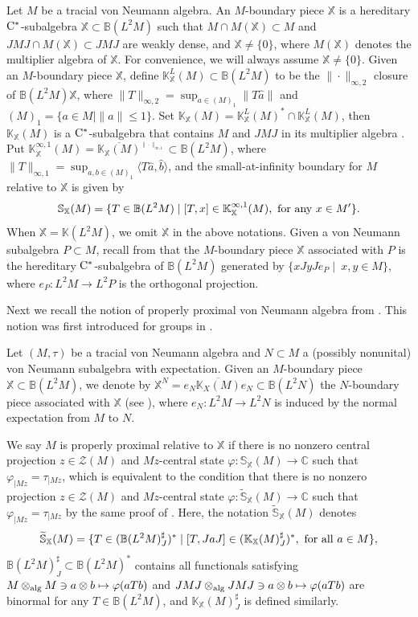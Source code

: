 \documentclass[a4paper,11pt]{amsart}
\theoremstyle{definition}
\newcommand{\B}{{\mathbb B}}
\newcommand{\C}{{\mathbb C}}
\newcommand{\K}{{\mathbb K}}
\newcommand{\bS}{{\mathbb S}}
\newcommand{\X}{{\mathbb X}}
\newcommand{\cZ}{{\mathcal Z}}
\newcommand{\ot}{\otimes}
\begin{document}
Let $M$ be a tracial von Neumann algebra.
An $M$-boundary piece $\X$ is a hereditary ${\rm C}^*$-subalgebra $\X\subset\B(L^2M)$
	such that $M\cap M(\X)\subset M$ and $JMJ\cap M(\X)\subset JMJ$ are weakly dense,
	and $\X\neq \{0\}$,
	where $M(\X)$ denotes the multiplier algebra of $\X$.
For convenience, we will always assume $\X\neq \{0\}$.
Given an $M$-boundary piece $\X$, define $\K_\X^L(M)\subset \B(L^2M)$ to be the $\|\cdot\|_{\infty,2}$ closure of $\B(L^2M)\X$,
	where $\|T\|_{\infty,2}=\sup_{a\in (M)_1}\|T\hat a\|$
		and $(M)_1=\{a\in M\mid \|a\|\leq 1\}$.
Set $\K_\X(M)=\K_\X^L(M)^*\cap \K_\X^L(M)$,
	then $\K_\X(M)$ is a ${\rm C}^*$-subalgebra that contains $M$ and $JMJ$ in its multiplier algebra \cite[Proposition 3.5]{DKEP22}. 
Put $\K^{\infty,1}_\X(M)=\overline{\K_\X(M)}^{_{\|\cdot\|_{\infty,1}}}\subset \B(L^2M)$, 
	where $\|T\|_{\infty,1}=\sup_{a,b\in (M)_1}\langle T\hat a, \hat b\rangle$,
	and the small-at-infinity boundary for $M$ relative to $\X$ is given by 
$$
\bS_\X(M)=\{T\in\B(L^2M)\mid [T,x]\in \K_\X^{\infty,1}(M),{\rm\ for\ any\ }x\in M'\}.
$$
When $\X=\K(L^2M)$, we omit $\X$ in the above notations.
Given a von Neumann subalgebra $P\subset M$, recall from \cite[Lemma 6.12]{DP23}
	that the $M$-boundary piece $\X$ associated with $P$ is the
	hereditary ${\rm C}^*$-subalgebra of $\B(L^2M)$ 
	generated by $\{x JyJ e_P\mid\  x,y\in M\}$,
	where $e_P: L^2M\to L^2P$ is the orthogonal projection.



Next we recall the notion of properly proximal von Neumann algebra from \cite{DKEP22}. This notion was first introduced for groups
	in \cite{BIP21}.

Let $(M,\tau)$ be a tracial von Neumann algebra and $N\subset M$ a (possibly nonunital) von Neumann subalgebra with expectation.
Given an $M$-boundary piece $\X\subset \B(L^2M)$, we denote by $\X^N=\overline{e_N \K_X(M) e_N}\subset \B(L^2N)$ the $N$-boundary piece
	associated with $\X$ (see \cite[Remark 6.3]{DKEP22}),
	where $e_N: L^2M\to L^2N$ is induced by the normal expectation from $M$ to $N$.
	
We say $M$ is properly proximal relative to $\X$
	if there is no nonzero central projection $z\in \cZ(M)$ and $Mz$-central state
	$\varphi: \bS_{\X}(M)\to \C$ such that $\varphi_{\mid Mz}=\tau_{\mid Mz}$,
	which is equivalent to the condition that
	there is no nonzero projection $z\in \cZ(M)$ and $Mz$-central state $\varphi: \widetilde \bS_\X(M)\to \C$
	such that $\varphi_{\mid Mz}=\tau_{\mid Mz}$
	by the same proof of \cite[Lemma 8.5]{DKEP22}.
Here, the notation $\widetilde \bS_\X(M)$ denotes
$$
\widetilde \bS_\X(M)=\{T\in (\B(L^2M)^\sharp_J)^*\mid [T,JaJ]\in (\K_\X(M)^\sharp_J)^*,{\rm\  for\ all\ }a\in M\},
$$
	$\B(L^2M)^\sharp_J\subset \B(L^2M)^*$ contains all functionals satisfying
	$M\ot_{\rm alg} M\ni a\ot b\mapsto \varphi(aTb)$
	and $JMJ\ot_{\rm alg} JMJ\ni a\ot b\mapsto \varphi(aTb)$ are binormal for any $T\in \B(L^2M)$,
	and $\K_\X(M)^\sharp_J$ is defined similarly.
\end{document}
